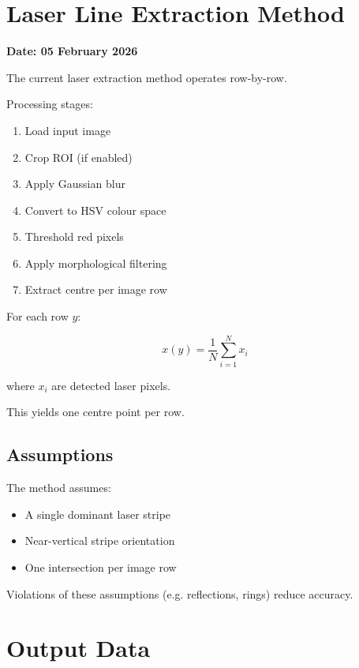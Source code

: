 \documentclass[11pt,a4paper]{article}
\begin{document}
\section{Laser Line Extraction Method}

\textbf{Date: 05 February 2026}

The current laser extraction method operates row-by-row.

Processing stages:

\begin{enumerate}
  \item Load input image
  \item Crop ROI (if enabled)
  \item Apply Gaussian blur
  \item Convert to HSV colour space
  \item Threshold red pixels
  \item Apply morphological filtering
  \item Extract centre per image row
\end{enumerate}

For each row $y$:

\begin{equation}
x(y) = \frac{1}{N}\sum_{i=1}^{N} x_i
\end{equation}

where $x_i$ are detected laser pixels.

This yields one centre point per row.

\subsection{Assumptions}

The method assumes:

\begin{itemize}
  \item A single dominant laser stripe
  \item Near-vertical stripe orientation
  \item One intersection per image row
\end{itemize}

Violations of these assumptions (e.g. reflections, rings) reduce accuracy.

\section{Output Data}
\end{document}

